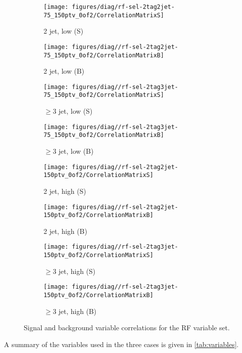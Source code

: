\begin{figure}[!htbp]\captionsetup{justification=centering}
  \centering
\begin{subfigure}[t]{0.220000\textwidth}\centering\texttt{[image: figures/diag/rf-sel-2tag2jet-75\_150ptv\_0of2/CorrelationMatrixS]}\caption{2 jet, low \ptv (S)}\end{subfigure}
\begin{subfigure}[t]{0.220000\textwidth}\centering\texttt{[image: figures/diag//rf-sel-2tag2jet-75\_150ptv\_0of2/CorrelationMatrixB]}\caption{2 jet, low \ptv (B)}\end{subfigure}
\begin{subfigure}[t]{0.220000\textwidth}\centering\texttt{[image: figures/diag//rf-sel-2tag3jet-75\_150ptv\_0of2/CorrelationMatrixS]}\caption{$\ge3$ jet, low \ptv (S)}\end{subfigure}
\begin{subfigure}[t]{0.220000\textwidth}\centering\texttt{[image: figures/diag//rf-sel-2tag3jet-75\_150ptv\_0of2/CorrelationMatrixB]}\caption{$\ge3$ jet, low \ptv (B)}\end{subfigure}
\begin{subfigure}[t]{0.220000\textwidth}\centering\texttt{[image: figures/diag//rf-sel-2tag2jet-150ptv\_0of2/CorrelationMatrixS]}\caption{2 jet, high \ptv (S)}\end{subfigure}
\begin{subfigure}[t]{0.220000\textwidth}\centering\texttt{[image: figures/diag//rf-sel-2tag2jet-150ptv\_0of2/CorrelationMatrixB]}\caption{2 jet, high \ptv (B)}\end{subfigure}
\begin{subfigure}[t]{0.220000\textwidth}\centering\texttt{[image: figures/diag//rf-sel-2tag3jet-150ptv\_0of2/CorrelationMatrixS]}\caption{$\ge3$ jet, high \ptv (S)}\end{subfigure}
\begin{subfigure}[t]{0.220000\textwidth}\centering\texttt{[image: figures/diag//rf-sel-2tag3jet-150ptv\_0of2/CorrelationMatrixB]}\caption{$\ge3$ jet, high \ptv (B)}\end{subfigure}
  \caption{Signal and background variable correlations for the RF variable set.}
  \label{fig:rf-sel-Correlations}
\end{figure}

A summary of the variables used in the three cases is given in \ref{tab:variables}.

